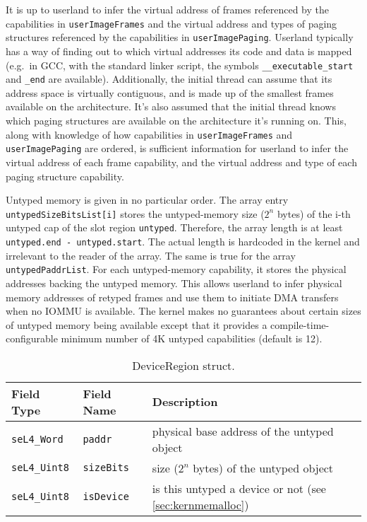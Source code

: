 It is up to userland to infer the virtual address of frames referenced by
the capabilities in \texttt{userImageFrames} and the virtual address and
types of paging structures
referenced by the capabilities in \texttt{userImagePaging}.
Userland typically has a way of finding out to which virtual addresses its
code and data is mapped (e.g.\ in GCC, with the standard linker script, the
symbols \texttt{\_\_executable\_start} and \texttt{\_end} are available).
Additionally, the initial thread can assume that its address space is virtually
contiguous, and is made up of the smallest frames available on the architecture.
It's also assumed that the initial thread knows which paging structures are
available on the architecture it's running on.
This, along with knowledge of how capabilities in \texttt{userImageFrames} and
\texttt{userImagePaging} are ordered, is sufficient information for userland to infer
the virtual address of each
frame capability, and the virtual address and type of each paging structure capability.

Untyped memory is given in no particular order. The array entry
\texttt{untypedSizeBitsList[i]} stores the untyped-memory size ($2^n$ bytes) of
the i-th untyped cap of the slot region \texttt{untyped}. Therefore, the array
length is at least \texttt{untyped.end - untyped.start}. The actual length is
hardcoded in the kernel and irrelevant to the reader of the array.
The same is true for the array \texttt{untypedPaddrList}. For each
untyped-memory capability, it stores the physical addresses backing the
untyped memory. This allows
userland to infer physical memory addresses of retyped frames and use them to
initiate DMA transfers when no IOMMU is available. The kernel makes no
guarantees about certain sizes of untyped memory being available except that it
provides a compile-time-configurable minimum number of 4K untyped capabilities
(default is 12).

\begin{table}[htb]
  \begin{center}
    \caption{DeviceRegion struct.}
    \label{tab:device_region_struct}
    \begin{tabular}{lll}
      \toprule
      Field Type & Field Name & Description \\
      \midrule
      \texttt{seL4\_Word}  & \texttt{paddr}    & physical base address of the untyped object \\
      \texttt{seL4\_Uint8} & \texttt{sizeBits} & size ($2^n$ bytes) of the untyped object \\
      \texttt{seL4\_Uint8} & \texttt{isDevice} & is this untyped a device or not (see \autoref{sec:kernmemalloc}) \\
      \bottomrule
    \end{tabular}
  \end{center}
\end{table}

